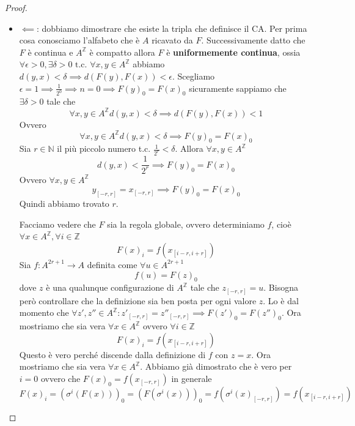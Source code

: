 \begin{teorema} 
\begin{proof}
\begin{itemize}
                  Successivamente dimostriamo $F\circ \sigma = \sigma \circ F\implies F(\sigma(x)) = \sigma(F(x)), \forall x \in A^\mathbb{Z}$.
                  l'uguaglianza precedente può essere riscritta come $\forall x \in A^\mathbb{Z}, \forall i \in \mathbb{Z}, (F(\sigma(x)))_i =(\sigma(F(x)))_i$.
                  Possiamo notare che
                  $$(F(\sigma(x)))_i = f(\sigma(x)_{[i-r,i+r]})=f(x_{[i-r+1,i+r+1]})$$
                  Inoltre
                  $$(\sigma(F(x)))_i =F(x)_{i+1} =f(x_{[i+1-r,i+1+r]})$$
                  Abbiamo dimostrato che commutano.
            \item $\impliedby$: dobbiamo dimostrare che esiste la tripla che definisce il CA.
                  Per prima cosa conosciamo l'alfabeto che è $A$ ricavato da $F$. Successivamente
                  datto che $F$ è continua e $A^\mathbb{Z}$ è compatto allora $F$ è \textbf{uniformemente
                      continua}, ossia $\forall\epsilon >0,\exists \delta > 0 \text{ t.c. } \forall x,y \in A^\mathbb{Z}$
                  abbiamo $d(y,x)<\delta \implies d(F(y), F(x)) < \epsilon$. Scegliamo $\epsilon = 1\implies \frac{1}{2^0}\implies n=0\implies F(y)_0= F(x)_0$
                  sicuramente sappiamo che $\exists \delta >0$ tale che $$\forall x,y \in A^\mathbb{Z} d(y,x)<\delta \implies d(F(y), F(x)) < 1$$
                  Ovvero $$\forall x,y \in A^\mathbb{Z} d(y,x)<\delta \implies F(y)_0= F(x)_0$$
                  Sia $r\in \mathbb{N}$ il più piccolo numero t.c. $\frac{1}{2^r}<\delta$.
                  Allora $\forall x,y \in A^\mathbb{Z}$
                  $$d(y,x)<\frac{1}{2^r} \implies F(y)_0= F(x)_0$$
                  Ovvero $\forall x,y \in A^\mathbb{Z}$
                  $$y_{[-r,r]} =x_{[-r,r]}\implies F(y)_0= F(x)_0$$
                  Quindi abbiamo trovato $r$.


                  Facciamo vedere che $F$ sia la regola globale, ovvero determiniamo $f$, cioè
                  $\forall x\in A^\mathbb{Z},\forall i\in\mathbb{Z}$
                  $$F(x)_i = f(x_{[i-r,i+r]})$$
                  Sia $f: A^{2r+1}\rightarrow A$ definita come $\forall u \in A^{2r+1}$
                  $$f(u) = F(z)_0$$ dove $z$ è una qualunque configurazione di
                  $A^\mathbb{Z}$ tale che $z_{[-r,r]} = u$. Bisogna però controllare che
                  la definizione sia ben posta per ogni valore $z$. Lo è dal momento che
                  $\forall z',z''\in A^\mathbb{Z}: z'_{[-r,r]} =  z''_{[-r,r]}\implies F(z')_0 = F(z'')_0$.
                  Ora mostriamo che sia vera $\forall x\in A^\mathbb{Z}$ ovvero $\forall i \in \mathbb{Z}$
                  $$F(x)_i = f(x_{[i-r,i+r]})$$
                  Questo è vero perché discende dalla definizione di $f$ con $z = x$.
                  Ora mostriamo che sia vera $\forall x\in A^\mathbb{Z}$. Abbiamo
                  già dimostrato che è vero per $i=0$ ovvero che $F(x)_0 = f(x_{[-r,r]})$
                  in generale
                  $$F(x)_i = (\sigma^i(F(x)))_0=(F(\sigma^i(x)))_0=f(\sigma^i(x)_{[-r,r]}) = f(x_{[i-r,i+r]})$$
        \end{itemize}
    \end{proof}
\end{teorema}

